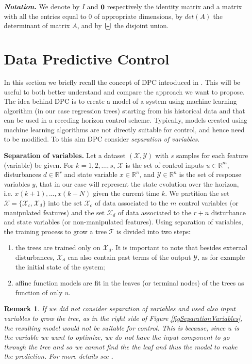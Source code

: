 \documentclass[letterpaper, 10 pt, conference]{ifacconf}  %
\newtheorem{remark}{Remark}
\begin{document}
\textbf{\emph{Notation.}} We denote by $I$ and $\bold{0}$ respectively the identity matrix and a matrix with all the entries equal to $0$ of appropriate dimensions, by $det(A)$ the determinant of matrix $A$, and by $\biguplus$ the disjoint union.

\section{Data Predictive Control}\label{secDPC}
In this section we briefly recall the concept of DPC introduced in \cite{JainACC2017}. This will be useful to both better understand and compare the approach we want to propose. The idea behind DPC is to create a model of a system using machine learning algorithm (in our case regression trees) starting from his historical data and that can be used in a receding horizon control scheme. Typically, models created using machine learning algorithms are not directly suitable for control, and hence need to be modified. To this aim DPC consider \emph{separation of variables}.

\textbf{Separation of variables.} Let a dataset $(\mathcal{X},\mathcal{Y})$ with $s$ samples for each feature (variable) be given. For $k=1,2,\ldots,s$, $\mathcal{X}$ is the set of control inputs $u\in\mathbb{R}^m$, disturbances $d\in\mathbb{R}^r$ and state variable $x\in\mathbb{R}^n$, and $\mathcal{Y}\in\mathbb{R}^n$ is the set of response variables $y$, that in our case will represent the state evolution over the horizon, i.e. $x(k+1),\ldots,x(k+N)$ given the current time $k$. We partition the set $\mathcal{X}=\{\mathcal{X}_c,\mathcal{X}_d\}$ into the set $\mathcal{X}_c$ of data associated to the $m$ control variables (or manipulated features) and the set $\mathcal{X}_d$ of data associated to the $r+n$ disturbance and state variables (or non-manipulated features). Using separation of variables, the training process to grow a tree $\mathcal{T}$ is divided into two steps:
\begin{enumerate}
\item the trees are trained only on $\mathcal{X}_d$. It is important to note that besides external disturbances, $\mathcal{X}_d$ can also contain past terms of the output $\mathcal{Y}$, as for example the initial state of the system;
\item affine function models are fit in the leaves (or terminal nodes) of the trees as function of only $u$. 
\end{enumerate}

\begin{remark}
	If we did not consider separation of variables and used also input variables to grow the tree, as in the right side of Figure \ref{figSeparationVariables}, the resulting model would not be suitable for control. This is because, since $u$ is the variable we want to optimize, we do not have the input component to go through the tree and so we cannot find the the leaf and thus the model to make the prediction. For more details see \cite{JainACC2017}.
\end{remark}
\end{document}
